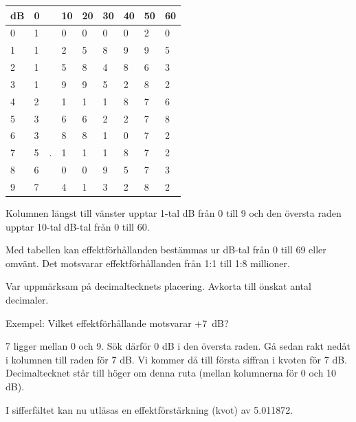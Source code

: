 \begin{rev-raderas}
\begin{tabular}{l|llllllll}
  dB & 0 & & 10 & 20 & 30 & 40 & 50 & 60 \\
  \hline
  0  & 1 & & 0  & 0  & 0  & 0  & 2  & 0 \\
  1  & 1 & & 2  & 5  & 8  & 9  & 9  & 5 \\
  2  & 1 & & 5  & 8  & 4  & 8  & 6  & 3 \\
  3  & 1 & & 9  & 9  & 5  & 2  & 8  & 2 \\
  4  & 2 & & 1  & 1  & 1  & 8  & 7  & 6 \\
  5  & 3 & & 6  & 6  & 2  & 2  & 7  & 8 \\
  6  & 3 & & 8  & 8  & 1  & 0  & 7  & 2 \\
  7  & 5 &.& 1  & 1  & 1  & 8  & 7  & 2 \\
  8  & 6 & & 0  & 0  & 9  & 5  & 7  & 3 \\
  9  & 7 & & 4  & 1  & 3  & 2  & 8  & 2 \\
\end{tabular}

Kolumnen längst till vänster upptar 1-tal dB från 0 till 9 och den
översta raden upptar 10-tal dB-tal från 0 till 60.

Med tabellen kan effektförhållanden bestämmas ur dB-tal från 0 till 69
eller omvänt.  Det motsvarar effektförhållanden från 1:1 till 1:8
millioner.

Var uppmärksam på decimaltecknets placering. Avkorta till önskat antal decimaler.

Exempel: Vilket effektförhållande motsvarar +7~dB?

7 ligger mellan 0 och 9. Sök därför 0 dB i den översta raden. Gå sedan
rakt nedåt i kolumnen till raden för 7 dB. Vi kommer då till första
siffran i kvoten för 7 dB. Decimaltecknet står till höger om denna
ruta (mellan kolumnerna för 0 och 10 dB).

I sifferfältet kan nu utläsas en effektförstärkning (kvot) av
5.011872.

\end{rev-raderas}

